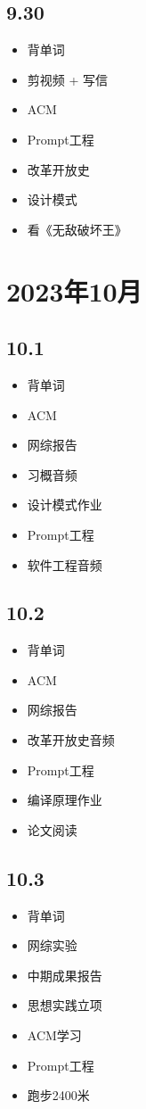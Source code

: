 \documentclass[UTF8]{ctexart}
\begin{document}
\subsection*{9.30}
\begin{itemize}
    \item 背单词
    \item 剪视频 + 写信
    \item ACM
    \item Prompt工程
    \item 改革开放史
    \item 设计模式
    \item 看《无敌破坏王》
\end{itemize}
\section*{2023年10月}
\subsection*{10.1}
\begin{itemize}
    \item 背单词
    \item ACM
    \item 网综报告
    \item 习概音频
    \item 设计模式作业
    \item Prompt工程
    \item 软件工程音频
\end{itemize}
\subsection*{10.2}
\begin{itemize}
    \item 背单词
    \item ACM
    \item 网综报告
    \item 改革开放史音频
    \item Prompt工程
    \item 编译原理作业
    \item 论文阅读
\end{itemize}
\subsection*{10.3}
\begin{itemize}
    \item 背单词
    \item 网综实验
    \item 中期成果报告
    \item 思想实践立项
    \item ACM学习
    \item Prompt工程
    \item 跑步2400米
\end{itemize}
\end{document}
